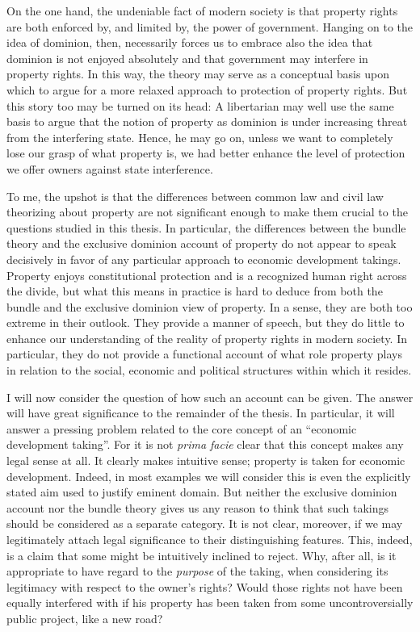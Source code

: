 On the one hand, the undeniable fact of modern society is that property rights are both enforced by, and limited by, the power of government. Hanging on to the idea of dominion, then, necessarily forces us to embrace also the idea that dominion is not enjoyed absolutely and that government may interfere in property rights. In this way, the theory may serve as a conceptual basis upon which to argue for a more relaxed approach to protection of property rights. But this story too may be turned on its head: A libertarian may well use the same basis to argue that the notion of property as dominion is under increasing threat from the interfering state. Hence, he may go on, unless we want to completely lose our grasp of what property is, we had better enhance the level of protection we offer owners against state interference. 

To me, the upshot is that the differences between common law and civil law theorizing about property are not significant enough to 
make them crucial to the questions studied in this thesis. In particular, the differences between the bundle theory and the exclusive dominion account of property do not appear to speak decisively in favor of any particular approach to economic development takings.   Property enjoys constitutional protection and is a recognized human right across the divide, but what this means in practice is hard to deduce from both the bundle and the exclusive dominion view of property. In a sense, they are both too extreme in their outlook. They provide a manner of speech, but they do little to enhance our understanding of the reality of property rights in modern society. In particular, they do not provide a functional account of what role property plays in relation to the social, economic and political structures within which it resides.

I will now consider the question of how such an account can be given. The answer will have great significance to the remainder of the thesis. In particular, it will answer a pressing problem related to the core concept of an ``economic development taking''. For it is not {\it prima facie} clear that this concept makes any legal sense at all. It clearly makes intuitive sense; property is taken for economic development. Indeed, in most examples we will consider this is even the explicitly stated aim used to justify eminent domain. But neither the exclusive dominion account nor the bundle theory gives us any reason to think that such takings should be considered as a separate category. It is not clear, moreover, if we may legitimately attach legal significance to their distinguishing features. This, indeed, is a claim that some might be intuitively inclined to reject. Why, after all, is it appropriate to have regard to the {\it purpose} of the taking, when considering its legitimacy with respect to the owner's rights? Would those rights not have been equally interfered with if his property has been taken from some uncontroversially public project, like a new road? 



